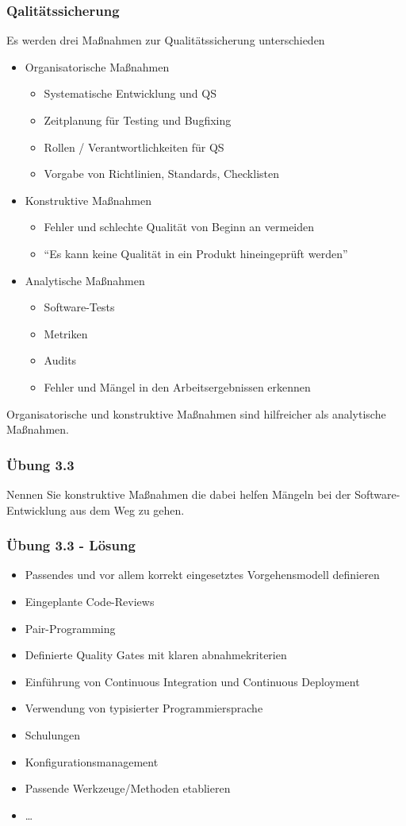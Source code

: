\begin{frame}
\frametitle{Qalitätssicherung}
	Es werden drei Maßnahmen zur Qualitätssicherung unterschieden
	\begin{itemize}
		\item Organisatorische Maßnahmen
					\begin{itemize}
						\item Systematische Entwicklung und QS
						\item Zeitplanung für Testing und Bugfixing
						\item Rollen / Verantwortlichkeiten für QS
						\item Vorgabe von Richtlinien, Standards, Checklisten
					\end{itemize}
		\item Konstruktive Maßnahmen
					\begin{itemize}
						\item Fehler und schlechte Qualität von Beginn an vermeiden
						\item ``Es kann keine Qualität in ein Produkt hineingeprüft werden''
					\end{itemize}
		\item Analytische Maßnahmen
					\begin{itemize}
						\item Software-Tests
						\item Metriken
						\item Audits
						\item Fehler und Mängel in den Arbeitsergebnissen erkennen
					\end{itemize}
	\end{itemize}
	Organisatorische und konstruktive Maßnahmen sind hilfreicher als analytische Maßnahmen.
\end{frame}

\begin{frame}
\frametitle{Übung 3.3}
	Nennen Sie konstruktive Maßnahmen die dabei helfen Mängeln bei der Software-Entwicklung aus dem
	Weg zu gehen.
\end{frame}

\ifloesung
\begin{frame}
\frametitle{Übung 3.3 - Lösung}
	\begin{itemize}
		\item Passendes und vor allem korrekt eingesetztes Vorgehensmodell definieren
		\item Eingeplante Code-Reviews
		\item Pair-Programming
		\item Definierte Quality Gates mit klaren abnahmekriterien
		\item Einführung von Continuous Integration und Continuous Deployment
		\item Verwendung von typisierter Programmiersprache
		\item Schulungen
		\item Konfigurationsmanagement
		\item Passende Werkzeuge/Methoden etablieren
		\item \ldots
	\end{itemize}
\end{frame}
\fi

